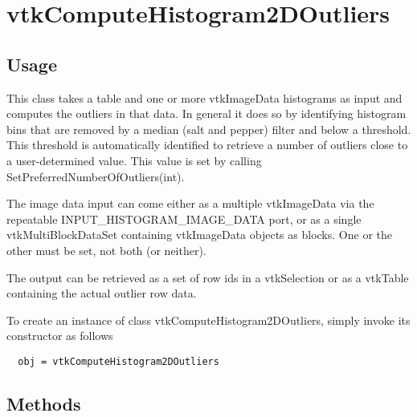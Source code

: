 \section{vtkComputeHistogram2DOutliers}

\subsection{Usage}

  This class takes a table and one or more vtkImageData histograms as input
  and computes the outliers in that data.  In general it does so by 
  identifying histogram bins that are removed by a median (salt and pepper)
  filter and below a threshold.  This threshold is automatically identified
  to retrieve a number of outliers close to a user-determined value.  This
  value is set by calling SetPreferredNumberOfOutliers(int).

  The image data input can come either as a multiple vtkImageData via the 
  repeatable INPUT\_HISTOGRAM\_IMAGE\_DATA port, or as a single 
  vtkMultiBlockDataSet containing vtkImageData objects as blocks.  One
  or the other must be set, not both (or neither).
 
  The output can be retrieved as a set of row ids in a vtkSelection or
  as a vtkTable containing the actual outlier row data.


To create an instance of class vtkComputeHistogram2DOutliers, simply
invoke its constructor as follows
\begin{verbatim}
  obj = vtkComputeHistogram2DOutliers
\end{verbatim}
\subsection{Methods}


